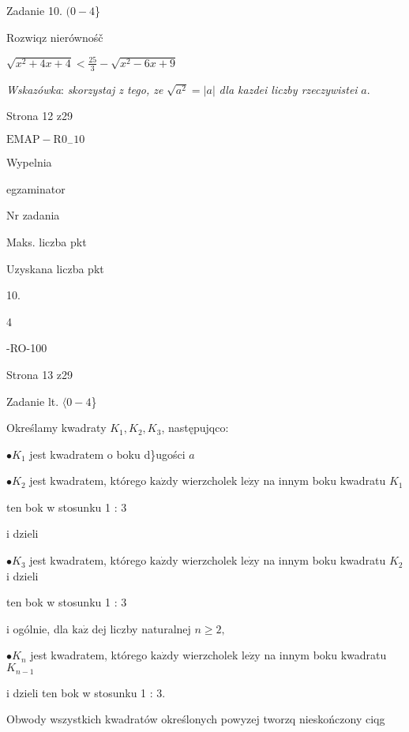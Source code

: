 \documentclass[a4paper,12pt]{article}
\begin{document}
Zadanie 10. $(0-4$\}

Rozwiqz nierównośč

$\displaystyle \sqrt{x^{2}+4x+4}<\frac{25}{3}-\sqrt{x^{2}-6x+9}$

{\it Wskazówka}: {\it skorzystaj z tego, ze} $\sqrt{a^{2}}=|a|$ {\it dla kazdei liczby rzeczywistei} $a.$

Strona 12 z29

$\mathrm{E}\mathrm{M}\mathrm{A}\mathrm{P}-\mathrm{R}0_{-}10$





Wypelnia

egzaminator

Nr zadania

Maks. liczba pkt

Uzyskana liczba pkt

10.

4

-RO-100

Strona 13 z29





Zadanie lt. $\langle 0-4$\}

Określamy kwadraty $K_{1}, K_{2}, K_{3}$, następujqco:

$\bullet K_{1}$ jest kwadratem o boku d\}ugości $a$

$\bullet K_{2}$ jest kwadratem, którego $\mathrm{k}\mathrm{a}\dot{\mathrm{z}}\mathrm{d}\mathrm{y}$ wierzcholek $\mathrm{l}\mathrm{e}\dot{\mathrm{z}}\mathrm{y}$ na innym boku kwadratu $K_{1}$

ten bok w stosunku 1 : 3

i dzieli

$\bullet K_{3}$ jest kwadratem, którego $\mathrm{k}\mathrm{a}\dot{\mathrm{z}}\mathrm{d}\mathrm{y}$ wierzcholek $\mathrm{l}\mathrm{e}\dot{\mathrm{z}}\mathrm{y}$ na innym boku kwadratu $K_{2}$ i dzieli

ten bok w stosunku 1 : 3

i ogólnie, dla $\mathrm{k}\mathrm{a}\dot{\mathrm{z}}$ dej liczby naturalnej $n\geq 2,$

$\bullet K_{n}$ jest kwadratem, którego $\mathrm{k}\mathrm{a}\dot{\mathrm{z}}\mathrm{d}\mathrm{y}$ wierzcholek $\mathrm{l}\mathrm{e}\dot{\mathrm{z}}\mathrm{y}$ na innym boku kwadratu $K_{n-1}$

i dzieli ten bok w stosunku 1 : 3.

Obwody wszystkich kwadratów określonych powyzej tworzq nieskończony ciqg
\end{document}
